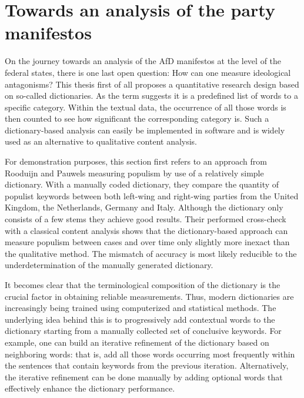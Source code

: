 \documentclass[a4paper]{scrreprt}
\begin{document}
\section{Towards an analysis of the party manifestos}
On the journey towards an analysis of the AfD manifestos at the level of the federal states, there is one last open question: How can one measure ideological antagonisms? This thesis first of all proposes a quantitative research design based on so-called dictionaries. As the term suggests it is a predefined list of words to a specific category. Within the textual data, the occurrence of all those words is then counted to see how significant the corresponding category is. Such a dictionary-based analysis can easily be implemented in software and is widely used as an alternative to qualitative content analysis.\par
For demonstration purposes, this section first refers to an approach from Rooduijn and Pauwels measuring populism by use of a relatively simple dictionary. \citep{rooduijn:2011} With a manually coded dictionary, they compare the quantity of populist keywords between both left-wing and right-wing parties from the United Kingdom, the Netherlands, Germany and Italy. Although the dictionary only consists of a few stems they achieve good results. Their performed cross-check with a classical content analysis shows that the dictionary-based approach can measure populism between cases and over time only slightly more inexact than the qualitative method. The mismatch of accuracy is most likely reducible to the underdetermination of the manually generated dictionary. \cite[p.~1279]{rooduijn:2011}\par
It becomes clear that the terminological composition of the dictionary is the crucial factor in obtaining reliable measurements. Thus, modern dictionaries are increasingly being trained using computerized and statistical methods. The underlying idea behind this is to progressively add contextual words to the dictionary starting from a manually collected set of conclusive keywords. For example, one can build an iterative refinement of the dictionary based on neighboring words: that is, add all those words occurring most frequently within the sentences that contain keywords from the previous iteration. Alternatively, the iterative refinement can be done manually by adding optional words that effectively enhance the dictionary performance.\par
\end{document}
